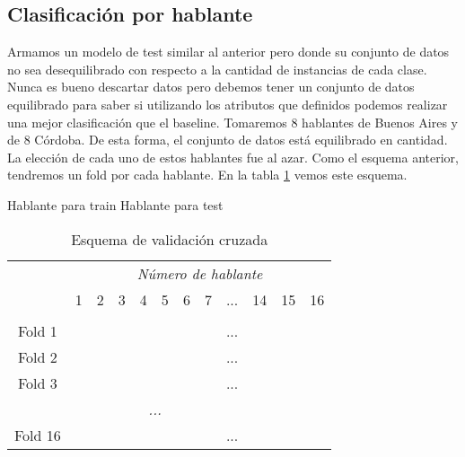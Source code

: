 \subsection{Clasificación por hablante}
\label{prom_los_atributos_de_cada_hablante}

Armamos un modelo de test similar al anterior pero donde su conjunto de datos no sea desequilibrado con respecto a la cantidad de instancias de cada clase. Nunca es bueno descartar datos pero debemos tener un conjunto de datos equilibrado para saber si utilizando los atributos que definidos podemos realizar una mejor clasificación que el baseline. Tomaremos 8 hablantes de Buenos Aires y de 8 Córdoba. De esta forma, el conjunto de datos está equilibrado en cantidad. La elección de cada uno de estos hablantes fue al azar. Como el esquema anterior, tendremos un fold por cada hablante. En la tabla \ref{PAH_esq_cv} vemos este esquema.

\begin{center}
	\mycirc[blue] Hablante para train \mycirc[red] Hablante para test
\end{center}

\begin{table}[H]
	\centering
	\begin{tabular}{cccccccccccc}
		& \multicolumn{11}{c}{\textit{Número de hablante}} \\
		& 1 & 2 & 3 & 4 & 5 & 6 & 7 & ... & 14 & 15 & 16 \\
		\hline \\
		Fold 1 &\mycirc[red] & \mycirc[blue] & \mycirc[blue]  & \mycirc[blue]  & \mycirc[blue]  & \mycirc[blue]  & \mycirc[blue] & ... & \mycirc[blue] & \mycirc[blue] & \mycirc[blue]  \\
		
		Fold 2 &\mycirc[blue] & \mycirc[red] & \mycirc[blue]  & \mycirc[blue]  & \mycirc[blue]  & \mycirc[blue]  & \mycirc[blue] & ... & \mycirc[blue] & \mycirc[blue] & \mycirc[blue]  \\
		
		Fold 3 &\mycirc[blue] & \mycirc[blue] & \mycirc[red]  & \mycirc[blue]  & \mycirc[blue]  & \mycirc[blue]  & \mycirc[blue] & ... & \mycirc[blue] & \mycirc[blue] & \mycirc[blue]  \\
		
		\multicolumn{11}{c}{\textit{...}}	\\
		
		Fold 16 &\mycirc[blue] & \mycirc[blue] & \mycirc[blue]  & \mycirc[blue]  & \mycirc[blue]  & \mycirc[blue]  & \mycirc[blue] & ... & \mycirc[blue] & \mycirc[blue] & \mycirc[red]   \\
		
	\end{tabular}
	\caption{Esquema de validación cruzada}
	\label{PAH_esq_cv}
\end{table}

